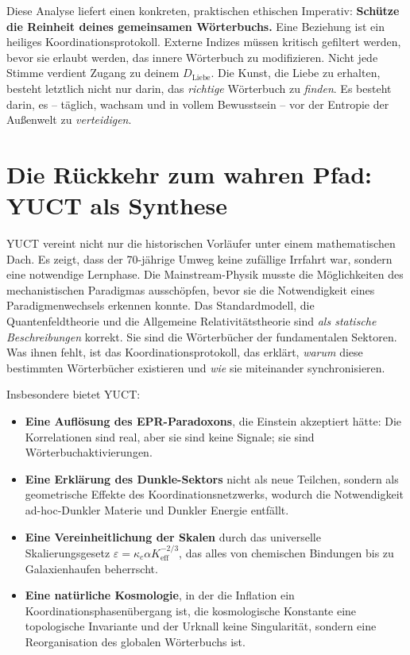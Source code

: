 \documentclass[12pt,a4paper]{article}
\begin{document}
	Diese Analyse liefert einen konkreten, praktischen ethischen Imperativ: \textbf{Schütze die Reinheit deines gemeinsamen Wörterbuchs.} Eine Beziehung ist ein heiliges Koordinationsprotokoll. Externe Indizes müssen kritisch gefiltert werden, bevor sie erlaubt werden, das innere Wörterbuch zu modifizieren. Nicht jede Stimme verdient Zugang zu deinem \(D_{\text{Liebe}}\). Die Kunst, die Liebe zu erhalten, besteht letztlich nicht nur darin, das \textit{richtige} Wörterbuch zu \textit{finden}. Es besteht darin, es – täglich, wachsam und in vollem Bewusstsein – vor der Entropie der Außenwelt zu \textit{verteidigen}.
	
	\section{Die Rückkehr zum wahren Pfad: YUCT als Synthese}
	
	YUCT vereint nicht nur die historischen Vorläufer unter einem mathematischen Dach. Es zeigt, dass der 70-jährige Umweg keine zufällige Irrfahrt war, sondern eine notwendige Lernphase. Die Mainstream-Physik musste die Möglichkeiten des mechanistischen Paradigmas ausschöpfen, bevor sie die Notwendigkeit eines Paradigmenwechsels erkennen konnte. Das Standardmodell, die Quantenfeldtheorie und die Allgemeine Relativitätstheorie sind \emph{als statische Beschreibungen} korrekt. Sie sind die Wörterbücher der fundamentalen Sektoren. Was ihnen fehlt, ist das Koordinationsprotokoll, das erklärt, \emph{warum} diese bestimmten Wörterbücher existieren und \emph{wie} sie miteinander synchronisieren.
	
	Insbesondere bietet YUCT:
	\begin{itemize}
		\item \textbf{Eine Auflösung des EPR-Paradoxons}, die Einstein akzeptiert hätte: Die Korrelationen sind real, aber sie sind keine Signale; sie sind Wörterbuchaktivierungen.
		\item \textbf{Eine Erklärung des Dunkle-Sektors} nicht als neue Teilchen, sondern als geometrische Effekte des Koordinationsnetzwerks, wodurch die Notwendigkeit ad-hoc-Dunkler Materie und Dunkler Energie entfällt.
		\item \textbf{Eine Vereinheitlichung der Skalen} durch das universelle Skalierungsgesetz \(\varepsilon = \kappa_c \alpha K_{\mathrm{eff}}^{-2/3}\), das alles von chemischen Bindungen bis zu Galaxienhaufen beherrscht.
		\item \textbf{Eine natürliche Kosmologie}, in der die Inflation ein Koordinationsphasenübergang ist, die kosmologische Konstante eine topologische Invariante und der Urknall keine Singularität, sondern eine Reorganisation des globalen Wörterbuchs ist.
	\end{itemize}
	
\end{document}
